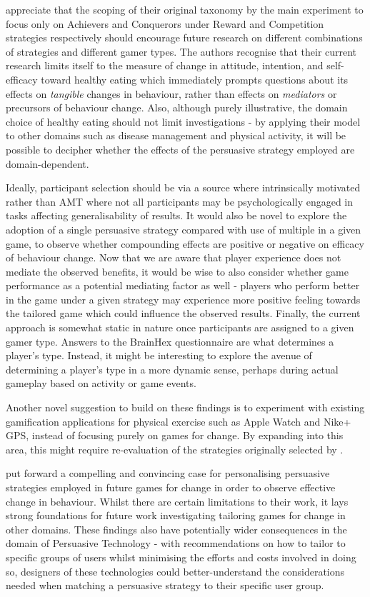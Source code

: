 \documentclass[11pt]{article}
\begin{document}
\citeauthor{orji2017} appreciate that the scoping of their original taxonomy by the main experiment to focus only on Achievers and Conquerors under Reward and Competition strategies respectively should encourage future research on different combinations of strategies and different gamer types. The authors recognise that their current research limits itself to the measure of change in attitude, intention, and self-efficacy toward healthy eating which immediately prompts questions about its effects on \textit{tangible} changes in behaviour, rather than effects on \textit{mediators} or precursors of behaviour change. Also, although purely illustrative, the domain choice of healthy eating should not limit investigations - by applying their model to other domains such as disease management and physical activity, it will be possible to decipher whether the effects of the persuasive strategy employed are domain-dependent.  

Ideally, participant selection should be via a source where intrinsically motivated rather than AMT where not all participants may be psychologically engaged in tasks affecting generalisability of results. It would also be novel to explore the adoption of a single persuasive strategy compared with use of multiple in a given game, to observe whether compounding effects are positive or negative on efficacy of behaviour change. Now that we are aware that player experience does not mediate the observed benefits, it would be wise to also consider whether game performance as a potential mediating factor as well - players who perform better in the game under a given strategy may experience more positive feeling towards the tailored game which could influence the observed results. Finally, the current approach is somewhat static in nature once participants are assigned to a given gamer type. Answers to the BrainHex questionnaire are what determines a player's type. Instead, it might be interesting to explore the avenue of determining a player's type in a more dynamic sense, perhaps during actual gameplay based on activity or game events.

Another novel suggestion to build on these findings is to experiment with existing gamification applications for physical exercise such as Apple Watch and Nike+ GPS, instead of focusing purely on games for change. By expanding into this area, this might require re-evaluation of the strategies originally selected by \citet{gerling2014}.

\citet{orji2017} put forward a compelling and convincing case for personalising persuasive strategies employed in future games for change in order to observe effective change in behaviour. Whilst there are certain limitations to their work, it lays strong foundations for future work investigating tailoring games for change in other domains. These findings also have potentially wider consequences in the domain of Persuasive Technology - with recommendations on how to tailor to specific groups of users whilst minimising the efforts and costs involved in doing so, designers of these technologies could better-understand the considerations needed when matching a persuasive strategy to their specific user group.


\newpage
\small

\normalsize
\end{document}
